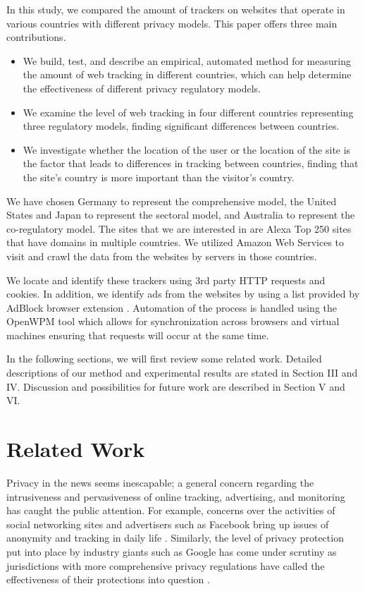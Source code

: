 \documentclass[conference]{IEEEtran}
\begin{document}
In this study, we compared the amount of trackers on websites that operate in various countries with different privacy models. This paper offers three main contributions.
\begin{itemize}
\item We build, test, and describe an empirical, automated method for measuring the amount of web tracking in different countries, which can help determine the effectiveness of different privacy regulatory models.
\item We examine the level of web tracking in four different countries representing three regulatory models, finding significant differences between countries.
\item We investigate whether the location of the user or the location of the site is the factor that leads to differences in tracking between countries, finding that the site's country is more important than the visitor's country.
\end{itemize}

We have chosen Germany to represent the comprehensive model, the United States and Japan to represent the sectoral model, and Australia to represent the co-regulatory model. The sites that we are interested in are Alexa Top 250 sites \cite{Alexa} that have domains in multiple countries. We utilized Amazon Web Services to visit and crawl the data from the websites by servers in those countries.

We locate and identify these trackers using 3rd party HTTP requests and cookies. In addition, we identify ads from the websites by using a list provided by AdBlock browser extension \cite{adblock}. Automation of the process is handled using the OpenWPM \cite{openwpm} tool which allows for synchronization across browsers and virtual machines ensuring that requests will occur at the same time. 

In the following sections, we will first review some related work. Detailed descriptions of our method and experimental results are stated in Section III and IV. Discussion and possibilities for future work are described in Section V and VI.


\section{Related Work}
Privacy in the news seems inescapable; a general concern regarding the intrusiveness and pervasiveness of online tracking, advertising, and monitoring has caught the public attention. For example, concerns over the activities of social networking sites and advertisers such as Facebook  bring up issues of anonymity and tracking in daily life \cite{wsj_fb}. Similarly, the level of privacy protection put into place by industry giants such as Google has come under scrutiny as jurisdictions with more comprehensive privacy regulations have called the effectiveness of their protections into question \cite{Google_EU_marketingland}.
\end{document}
